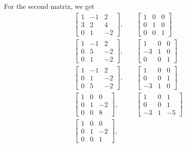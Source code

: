 \begin{solution}
  For the second matrix, we get
  \begin{align*}
    \begin{bmatrix}
      1 & -1 & 2 \\
      3 & 2 & 4 \\
      0 & 1 & -2
    \end{bmatrix},
    &\quad
    \begin{bmatrix}
      1 & 0 & 0 \\
      0 & 1 & 0 \\
      0 & 0 & 1
    \end{bmatrix} \\
    \begin{bmatrix}
      1 & -1 & 2 \\
      0 & 5 & -2 \\
      0 & 1 & -2
    \end{bmatrix},
    &\quad
    \begin{bmatrix}
      1 & 0 & 0 \\
      -3 & 1 & 0 \\
      0 & 0 & 1
    \end{bmatrix} \\
    \begin{bmatrix}
      1 & -1 & 2 \\
      0 & 1 & -2 \\
      0 & 5 & -2
    \end{bmatrix},
    &\quad
    \begin{bmatrix}
      1 & 0 & 0 \\
      0 & 0 & 1 \\
      -3 & 1 & 0
    \end{bmatrix} \\
    \begin{bmatrix}
      1 & 0 & 0 \\
      0 & 1 & -2 \\
      0 & 0 & 8
    \end{bmatrix},
    &\quad
    \begin{bmatrix}
      1 & 0 & 1 \\
      0 & 0 & 1 \\
      -3 & 1 & -5
    \end{bmatrix} \\
    \begin{bmatrix}
      1 & 0 & 0 \\[3pt]
      0 & 1 & -2 \\[3pt]
      0 & 0 & 1
    \end{bmatrix},

\end{align*}
\end{solution}
